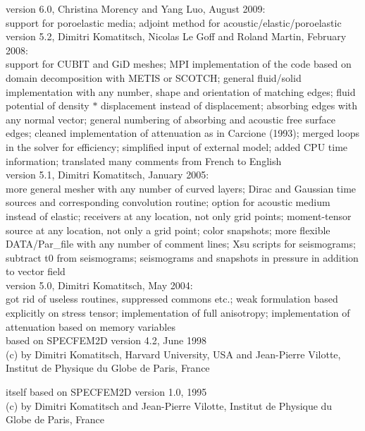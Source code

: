 version 6.0, Christina Morency and Yang Luo, August 2009:\\
support for poroelastic media;
adjoint method for acoustic/elastic/poroelastic\\

version 5.2, Dimitri Komatitsch, Nicolas Le Goff and Roland Martin, February 2008:\\
support for CUBIT and GiD meshes;
MPI implementation of the code based on domain decomposition with METIS or SCOTCH;
general fluid/solid implementation with any number, shape and orientation of matching edges;
fluid potential of density $*$ displacement instead of displacement;
absorbing edges with any normal vector;
general numbering of absorbing and acoustic free surface edges;
cleaned implementation of attenuation as in Carcione (1993);
merged loops in the solver for efficiency;
simplified input of external model;
added CPU time information;
translated many comments from French to English\\

version 5.1, Dimitri Komatitsch, January 2005:\\
more general mesher with any number of curved layers;
Dirac and Gaussian time sources and corresponding convolution routine;
option for acoustic medium instead of elastic;
receivers at any location, not only grid points;
moment-tensor source at any location, not only a grid point;
color snapshots;
more flexible DATA/Par\_file with any number of comment lines;
Xsu scripts for seismograms;
subtract t0 from seismograms;
seismograms and snapshots in pressure in addition to vector field\\

version 5.0, Dimitri Komatitsch, May 2004:\\
got rid of useless routines, suppressed commons etc.;
weak formulation based explicitly on stress tensor;
implementation of full anisotropy;
implementation of attenuation based on memory variables\\

based on SPECFEM2D version 4.2, June 1998\\
(c) by Dimitri Komatitsch, Harvard University, USA
and Jean-Pierre Vilotte, Institut de Physique du Globe de Paris, France

itself based on SPECFEM2D version 1.0, 1995\\
(c) by Dimitri Komatitsch and Jean-Pierre Vilotte,
Institut de Physique du Globe de Paris, France


